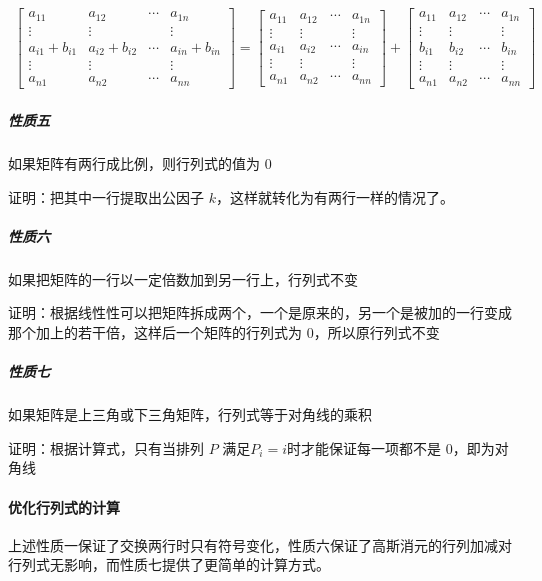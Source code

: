 \documentclass[UTF-8]{ctexart}
\begin{document}
			\begin{align}
			\begin{bmatrix} a _ {11} & a _ {12} & \cdots & a _ {1n} \\ \vdots & \vdots &  & \vdots \\ a _ {i1}+b _ {i1} & a _ {i2}+b _ {i2} & \cdots & a _ {in}+b _ {in} \\ \vdots & \vdots &  & \vdots \\ a _ {n1} & a _ {n2} & \cdots & a _ {nn} \end{bmatrix} = \begin{bmatrix} a _ {11} & a _ {12} & \cdots & a _ {1n} \\ \vdots & \vdots &  & \vdots \\ a _ {i1} & a _ {i2} & \cdots & a _ {in} \\ \vdots & \vdots &  & \vdots \\ a _ {n1} & a _ {n2} & \cdots & a _ {nn} \end{bmatrix} + \begin{bmatrix} a _ {11} & a _ {12} & \cdots & a _ {1n} \\ \vdots & \vdots &  & \vdots \\ b _ {i1} & b _ {i2} & \cdots & b _ {in} \\ \vdots & \vdots &  & \vdots \\ a _ {n1} & a _ {n2} & \cdots & a _ {nn} \end{bmatrix}\nonumber
			\end{align}
			
			\subparagraph{性质五} 如果矩阵有两行成比例，则行列式的值为 $0$
			
			证明：把其中一行提取出公因子 $k$，这样就转化为有两行一样的情况了。
			
			\subparagraph{性质六} 如果把矩阵的一行以一定倍数加到另一行上，行列式不变
			
			证明：根据线性性可以把矩阵拆成两个，一个是原来的，另一个是被加的一行变成那个加上的若干倍，这样后一个矩阵的行列式为 $0$，所以原行列式不变
			
			\subparagraph{性质七} 如果矩阵是上三角或下三角矩阵，行列式等于对角线的乘积
			
			证明：根据计算式，只有当排列 $P$ 满足$P _ i=i$时才能保证每一项都不是 $0$，即为对角线
			
			\paragraph{优化行列式的计算} 上述性质一保证了交换两行时只有符号变化，性质六保证了高斯消元的行列加减对行列式无影响，而性质七提供了更简单的计算方式。
			
\end{document}
